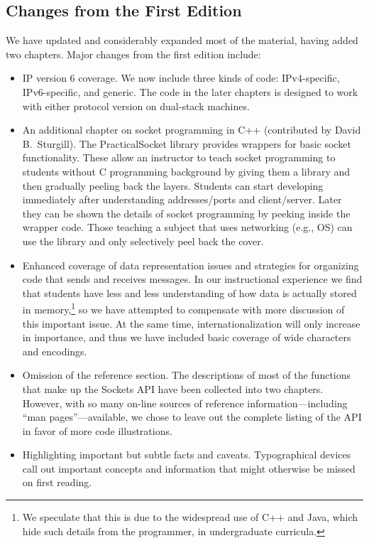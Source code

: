 \subsection*{Changes from the First Edition}

We have updated and considerably expanded most of the material, having
added two chapters.  Major changes from the first edition include:
\begin{itemize}
\item
IP version 6 coverage.  We now include three kinds of code:
IPv4-specific, IPv6-specific, and generic.  The code in the
later chapters is designed to work with either protocol version on
dual-stack machines.
\item
An additional chapter on socket programming in C++
(contributed by David B.\ Sturgill).
The PracticalSocket library provides wrappers for basic socket functionality.
These allow an instructor to teach socket programming to
students without C programming background by giving them a library and
then gradually peeling back the layers.  Students can start
developing immediately after understanding addresses/ports and
client/server.  Later they can be shown the details of socket programming by
peeking inside the wrapper code.
Those teaching a subject that uses networking (e.g., OS) can
use the library and only selectively peel back the cover.
\item
Enhanced coverage of data representation issues and strategies for
organizing code that sends and receives messages.  In our
instructional experience we find that students have less and less
understanding of how data is actually stored in memory,\footnote{We
speculate that this is due to the widespread use of C++ and Java,
which hide such details from the programmer, 
in undergraduate curricula.} so we have
attempted to compensate with more discussion of this important
issue.  At the same time, internationalization will only increase in
importance, and thus we have included basic coverage of
wide characters and encodings.
\item
Omission of the reference section.  The descriptions of
most of the functions that make up the Sockets API have been collected
into two chapters.  However, with so many on-line sources of reference
information---including ``man pages''---available,
we chose to leave out the complete listing of the API in favor of
more code illustrations.
\item
Highlighting important but subtle facts and caveats.  Typographical devices
call out important concepts and information that might otherwise
be missed on first reading.
\end{itemize}

